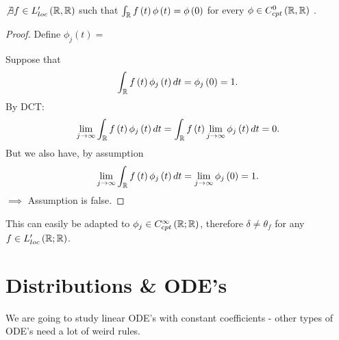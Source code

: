 \begin{example}	
	\begin{fact}
		$\not\exists f \in  L_{loc}'\left( \mathbb{R}, \mathbb{R} \right) $ such that $\int_{\mathbb{R}}^{ } f\left(  t\right)  \phi\left( t \right)  = \phi\left( 0 \right) $ for every $\phi \in  C^{0}_{cpt}\left( \mathbb{R}, \mathbb{R} \right)$ .  
\begin{proof}
	Define $\phi_{j}\left( t \right)  = $

	Suppose that 
	\[
		\int_{\mathbb{R}}^{} f\left( t  \right) \phi_{j}\left( t \right) dt = \phi_{j}\left( 0 \right) = 1  
	.\] 
	By DCT: 
	\[
		\lim_{j \to \infty} \int_{\R}^{ } f\left( t \right) \phi_{j}\left( t \right) dt = \int_{\R}^{ } f\left( t  \right) \lim_{j \to \infty} \phi_{j}\left( t  \right) dt = 0 
	.\] 
	But we also have, by assumption
	\begin{align*}
		\lim_{j \to \infty} \int_{\R}^{ } f\left( t \right) \phi_{j}\left( t \right) dt = \lim_{j \to \infty} \phi_{j}\left( 0 \right) = 1 
	.\end{align*}
	$\implies $ Assumption is false.
\end{proof}	

	\end{fact}
\end{example}
This can easily be adapted to $\phi_{j} \in C^{\infty}_{cpt}\left( \mathbb{R}; \mathbb{R} \right) $, therefore $\delta \neq \theta _{f}$ for any $f \in  L'_{loc}\left( \mathbb{R}; \mathbb{R} \right) $.  

\section{Distributions \& ODE's}
We are going to study linear ODE's with constant coefficients - other types of ODE's need a lot of weird rules. 

